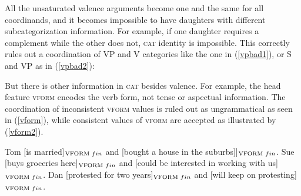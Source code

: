 \documentclass[output=paper
                ,modfonts
                ,nonflat
	        ,collection
	        ,collectionchapter
	        ,collectiontoclongg
 	        ,biblatex
                ,babelshorthands
                ,newtxmath
                ,draftmode
                ,colorlinks, citecolor=brown
]{./langsci/langscibook}
\begin{document}
All the unsaturated valence arguments become one and the same for all coordinands, and it becomes impossible to have daughters with different subcategorization information. For example, if one daughter requires a complement while the other does not,
\textsc{cat} identity  is impossible. This correctly rules out  a coordination of  VP and V categories
like the one in (\ref{vpbad1}), or S and VP as in (\ref{vpbad2}):

\begin{exe}
\ex
\begin{xlista}
\label{vpbad1}
 
 \label{vpbad2}
\end{xlista}
\end{exe}

But there is other information in \textsc{cat} besides valence. For example, the head feature  \textsc{vform}  encodes the verb form, not tense or aspectual information. The coordination of inconsistent \textsc{vform} values is   ruled out as ungrammatical as seen
 in (\ref{vform}), while  consistent values of \textsc{vform} are accepted  as illustrated by (\ref{vform2}).

\begin{exe}
\ex
\begin{xlista}
 \end{xlista} \label{vform}
\end{exe}



\begin{exe}
\ex \begin{xlista}
  \ex Tom [is married]$_{\textup{\scriptsize VFORM} \,\, fin}$ and
                   [bought  a house in the suburbs]]$_{\textup{\scriptsize VFORM} \,\, fin}$.
   \ex Sue [buys groceries here]$_{\textup{\scriptsize VFORM} \,\, fin}$ and
                   [could be interested in working with us]$_{\textup{\scriptsize VFORM} \,\, fin}$.
   \ex Dan [protested for two years]$_{\textup{\scriptsize VFORM} \,\, fin}$ and
                   [will keep on protesting]$_{\textup{\scriptsize VFORM} \,\, fin}$.
\end{xlista}\label{vform2}
\end{exe}
\end{document}

